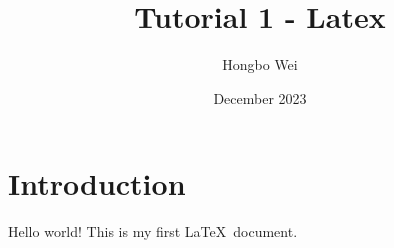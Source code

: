 \documentclass[11pt]{article}
\title{Tutorial 1 - Latex}
\author{Hongbo Wei}
\date{December 2023}
\begin{document}
\maketitle

\section{Introduction}
Hello world! This is my first \LaTeX\ document.
\end{document}

